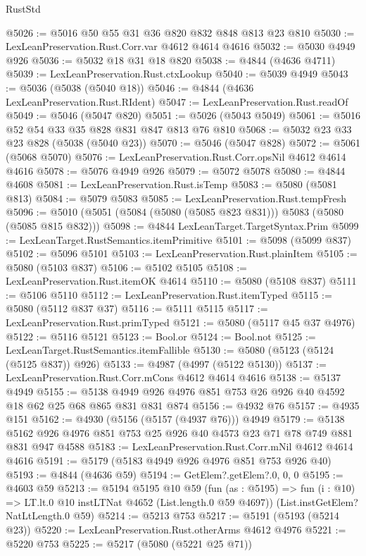 \begin{lexlean}{RustStd}
\begin{coremodule}
{\begin{coremodule}
{{{{{@5026 := @5016 @50 @55 @31 @36 @820 @832 @848 @813 @23 @810
@5030 := LexLeanPreservation.Rust.Corr.var @4612 @4614 @4616
@5032 := @5030 @4949 @926
@5036 := @5032 @18 @31 @18 @820
@5038 := @4844 (@4636 @4711)
@5039 := LexLeanPreservation.Rust.ctxLookup
@5040 := @5039 @4949
@5043 := @5036 (@5038 (@5040 @18))
@5046 := @4844 (@4636 LexLeanPreservation.Rust.RIdent)
@5047 := LexLeanPreservation.Rust.readOf
@5049 := @5046 (@5047 @820)
@5051 := @5026 (@5043 @5049)
@5061 := @5016 @52 @54 @33 @35 @828 @831 @847 @813 @76 @810
@5068 := @5032 @23 @33 @23 @828 (@5038 (@5040 @23))
@5070 := @5046 (@5047 @828)
@5072 := @5061 (@5068 @5070)
@5076 := LexLeanPreservation.Rust.Corr.opsNil @4612 @4614 @4616
@5078 := @5076 @4949 @926
@5079 := @5072 @5078
@5080 := @4844 @4608
@5081 := LexLeanPreservation.Rust.isTemp
@5083 := @5080 (@5081 @813)
@5084 := @5079 @5083
@5085 := LexLeanPreservation.Rust.tempFresh
@5096 := @5010 (@5051 (@5084 (@5080 (@5085 @823 @831))) @5083 (@5080 (@5085 @815 @832)))
@5098 := @4844 LexLeanTarget.TargetSyntax.Prim
@5099 := LexLeanTarget.RustSemantics.itemPrimitive
@5101 := @5098 (@5099 @837)
@5102 := @5096 @5101
@5103 := LexLeanPreservation.Rust.plainItem
@5105 := @5080 (@5103 @837)
@5106 := @5102 @5105
@5108 := LexLeanPreservation.Rust.itemOK @4614
@5110 := @5080 (@5108 @837)
@5111 := @5106 @5110
@5112 := LexLeanPreservation.Rust.itemTyped
@5115 := @5080 (@5112 @837 @37)
@5116 := @5111 @5115
@5117 := LexLeanPreservation.Rust.primTyped
@5121 := @5080 (@5117 @45 @37 @4976)
@5122 := @5116 @5121
@5123 := Bool.or
@5124 := Bool.not
@5125 := LexLeanTarget.RustSemantics.itemFallible
@5130 := @5080 (@5123 (@5124 (@5125 @837)) @926)
@5133 := @4987 (@4997 (@5122 @5130))
@5137 := LexLeanPreservation.Rust.Corr.mCons @4612 @4614 @4616
@5138 := @5137 @4949
@5155 := @5138 @4949 @926 @4976 @851 @753 @26 @926 @40 @4592 @18 @62 @25 @68 @865 @831 @831 @874
@5156 := @4932 @76
@5157 := @4935 @151
@5162 := @4930 (@5156 (@5157 (@4937 @76))) @4949
@5179 := @5138 @5162 @926 @4976 @851 @753 @25 @926 @40 @4573 @23 @71 @78 @749 @881 @831 @947 @4588
@5183 := LexLeanPreservation.Rust.Corr.mNil @4612 @4614 @4616
@5191 := @5179 (@5183 @4949 @926 @4976 @851 @753 @926 @40)
@5193 := @4844 (@4636 @59)
@5194 := GetElem?.getElem?.{0, 0, 0}
@5195 := @4603 @59
@5213 := @5194
    @5195
    @10
    @59
    (fun (as : @5195) => fun (i : @10) => LT.lt.{0} @10 instLTNat @4652 (List.length.{0} @59 @4697))
    (List.instGetElem?NatLtLength.{0} @59)
@5214 := @5213 @753
@5217 := @5191 (@5193 (@5214 @23))
@5220 := LexLeanPreservation.Rust.otherArms @4612 @4976
@5221 := @5220 @753
@5225 := @5217 (@5080 (@5221 @25 @71))
}}}}}
\end{coremodule}}
\end{coremodule}
\end{lexlean}
